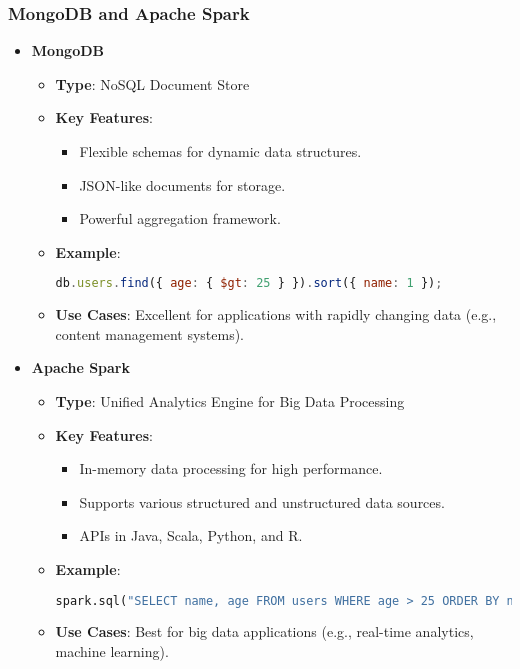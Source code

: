 \documentclass[aspectratio=169]{beamer}
\begin{document}
\begin{frame}[fragile]
    \frametitle{MongoDB and Apache Spark}
    \begin{itemize}
        \item \textbf{MongoDB}
        \begin{itemize}
            \item \textbf{Type}: NoSQL Document Store
            \item \textbf{Key Features}:
            \begin{itemize}
                \item Flexible schemas for dynamic data structures.
                \item JSON-like documents for storage.
                \item Powerful aggregation framework.
            \end{itemize}
            \item \textbf{Example}:
            \begin{lstlisting}[language=JavaScript]
            db.users.find({ age: { $gt: 25 } }).sort({ name: 1 });
            \end{lstlisting}
            \item \textbf{Use Cases}: Excellent for applications with rapidly changing data (e.g., content management systems).
        \end{itemize}

        \item \textbf{Apache Spark}
        \begin{itemize}
            \item \textbf{Type}: Unified Analytics Engine for Big Data Processing
            \item \textbf{Key Features}:
            \begin{itemize}
                \item In-memory data processing for high performance.
                \item Supports various structured and unstructured data sources.
                \item APIs in Java, Scala, Python, and R.
            \end{itemize}
            \item \textbf{Example}:
            \begin{lstlisting}[language=Python]
            spark.sql("SELECT name, age FROM users WHERE age > 25 ORDER BY name").show()
            \end{lstlisting}
            \item \textbf{Use Cases}: Best for big data applications (e.g., real-time analytics, machine learning).
        \end{itemize}
    \end{itemize}
\end{frame}
\end{document}
